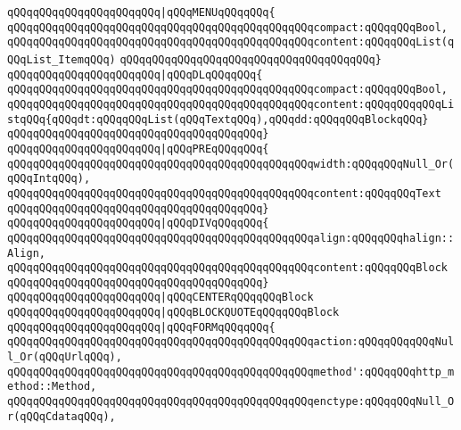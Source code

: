 \verb|qQQqqQQqqQQqqQQqqQQqqQQq|\verb#|qQQqMENUqQQqqQQq{#\newline
\verb|qQQqqQQqqQQqqQQqqQQqqQQqqQQqqQQqqQQqqQQqqQQqqQQqcompact:qQQqqQQqBool,|\newline
\verb|qQQqqQQqqQQqqQQqqQQqqQQqqQQqqQQqqQQqqQQqqQQqqQQqcontent:qQQqqQQqList(qQQqList_ItemqQQq)|\newline
\verb|qQQqqQQqqQQqqQQqqQQqqQQqqQQqqQQqqQQqqQQq}|\newline
\verb|qQQqqQQqqQQqqQQqqQQqqQQq|\verb#|qQQqDLqQQqqQQq{#\newline
\verb|qQQqqQQqqQQqqQQqqQQqqQQqqQQqqQQqqQQqqQQqqQQqqQQqcompact:qQQqqQQqBool,|\newline
\verb|qQQqqQQqqQQqqQQqqQQqqQQqqQQqqQQqqQQqqQQqqQQqqQQqcontent:qQQqqQQqqQQqListqQQq{qQQqdt:qQQqqQQqList(qQQqTextqQQq),qQQqdd:qQQqqQQqBlockqQQq}|\newline
\verb|qQQqqQQqqQQqqQQqqQQqqQQqqQQqqQQqqQQqqQQq}|\newline
\verb|qQQqqQQqqQQqqQQqqQQqqQQq|\verb#|qQQqPREqQQqqQQq{#\newline
\verb|qQQqqQQqqQQqqQQqqQQqqQQqqQQqqQQqqQQqqQQqqQQqqQQqwidth:qQQqqQQqNull_Or(qQQqIntqQQq),|\newline
\verb|qQQqqQQqqQQqqQQqqQQqqQQqqQQqqQQqqQQqqQQqqQQqqQQqcontent:qQQqqQQqText|\newline
\verb|qQQqqQQqqQQqqQQqqQQqqQQqqQQqqQQqqQQqqQQq}|\newline
\verb|qQQqqQQqqQQqqQQqqQQqqQQq|\verb#|qQQqDIVqQQqqQQq{#\newline
\verb|qQQqqQQqqQQqqQQqqQQqqQQqqQQqqQQqqQQqqQQqqQQqqQQqalign:qQQqqQQqhalign::Align,|\newline
\verb|qQQqqQQqqQQqqQQqqQQqqQQqqQQqqQQqqQQqqQQqqQQqqQQqcontent:qQQqqQQqBlock|\newline
\verb|qQQqqQQqqQQqqQQqqQQqqQQqqQQqqQQqqQQqqQQq}|\newline
\verb|qQQqqQQqqQQqqQQqqQQqqQQq|\verb#|qQQqCENTERqQQqqQQqBlock#\newline
\verb|qQQqqQQqqQQqqQQqqQQqqQQq|\verb#|qQQqBLOCKQUOTEqQQqqQQqBlock#\newline
\verb|qQQqqQQqqQQqqQQqqQQqqQQq|\verb#|qQQqFORMqQQqqQQq{#\newline
\verb|qQQqqQQqqQQqqQQqqQQqqQQqqQQqqQQqqQQqqQQqqQQqqQQqaction:qQQqqQQqqQQqNull_Or(qQQqUrlqQQq),|\newline
\verb|qQQqqQQqqQQqqQQqqQQqqQQqqQQqqQQqqQQqqQQqqQQqqQQqmethod':qQQqqQQqhttp_method::Method,|\newline
\verb|qQQqqQQqqQQqqQQqqQQqqQQqqQQqqQQqqQQqqQQqqQQqqQQqenctype:qQQqqQQqNull_Or(qQQqCdataqQQq),|\newline
